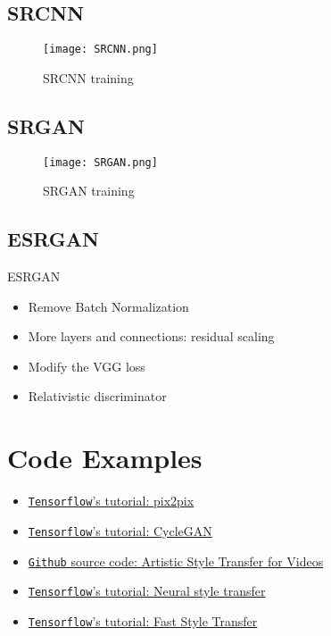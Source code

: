 \subsection{SRCNN}
\begin{figure}[hbt!]
	\centering
	\texttt{[image: SRCNN.png]}
	\caption{\ac{SRCNN} training \cite{dong2015image}}
\end{figure}

\subsection{SRGAN}
\begin{figure}[hbt!]
	\centering
	\texttt{[image: SRGAN.png]}
	\caption{\ac{SRGAN} training \cite{ledig2017photo}}
\end{figure}

\subsection{ESRGAN}
\ac{ESRGAN} \cite{wang2018esrgan}
\begin{itemize}
	\item Remove Batch Normalization
	\item More layers and connections: residual scaling
	\item Modify the VGG loss
	\item Relativistic discriminator
\end{itemize}

\section{Code Examples}
\begin{itemize}
	\item \href{https://www.tensorflow.org/tutorials/generative/pix2pix}{\texttt{Tensorflow}'s tutorial: pix2pix}
	\item \href{https://www.tensorflow.org/tutorials/generative/cyclegan}{\texttt{Tensorflow}'s tutorial: CycleGAN}
	\item \href{https://github.com/manuelruder/artistic-videos}{\texttt{Github} source code: Artistic Style Transfer for Videos}
	\item \href{https://www.tensorflow.org/tutorials/generative/style_transfer}{\texttt{Tensorflow}'s tutorial: Neural style transfer}
	\item \href{https://www.tensorflow.org/hub/tutorials/tf2_arbitrary_image_stylization}{\texttt{Tensorflow}'s tutorial: Fast Style Transfer}
\end{itemize}
